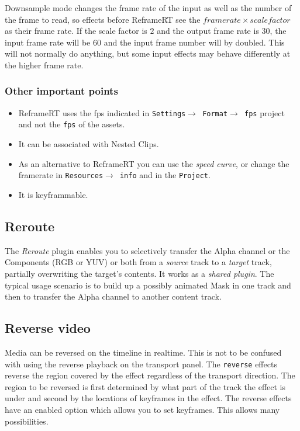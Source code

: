 Downsample mode changes the frame rate of the input as well as the number of the frame to read, so effects before ReframeRT see the $frame rate \times scale factor$ as their frame rate. If the scale factor is $2$ and the output frame rate is $30$, the input frame rate will be $60$ and the input frame number will by doubled. This will not normally do anything, but some input effects may behave differently at the higher frame rate.

\subsubsection*{Other important points}%
\label{ssub:other_important_points}

\begin{itemize}
    \item ReframeRT uses the fps indicated in \texttt{Settings$\rightarrow$ Format$\rightarrow$ fps} project and not the \texttt{fps} of the assets.
    \item It can be associated with Nested Clips.
    \item As an alternative to ReframeRT you can use the \textit{speed curve}, or change the framerate in \texttt{Resources$\rightarrow$ info} and in the \texttt{Project}.
    \item It is keyframmable.
\end{itemize}

\subsection{Reroute}%
\label{sub:reroute}

The \textit{Reroute} plugin enables you to selectively transfer the Alpha channel or the Components (RGB or YUV) or both from a \textit{source} track to a \textit{target} track, partially overwriting the target's contents. It works as a \textit{shared plugin}. The typical usage scenario is to build up a possibly animated Mask in one track and then to transfer the Alpha channel to another content track.

\subsection{Reverse video}%
\label{sub:reverse_video}

Media can be reversed on the timeline in realtime. This is not to be confused with using the reverse playback on the transport panel. The \texttt{reverse} effects reverse the region covered by the effect regardless of the transport direction. The region to be reversed is first determined by what part of the track the effect is under and second by the locations of keyframes in the effect. The reverse effects have an enabled option which allows you to set keyframes. This allows many possibilities.


